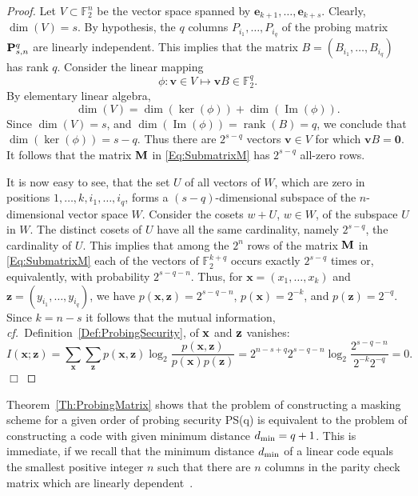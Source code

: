 \documentclass[11pt]{llncs}
\newcommand{\cf}{{\it cf.\ }}
\newcommand{\QED}{\hfill $\Box$}
\begin{document}
\begin{proof}
Let $V \subset \mathbb{F}_2^n$ be the vector space spanned by
$\mathbf{e}_{k+1},\dotsc,\mathbf{e}_{k+s}$.
Clearly, $\dim(V)= s$.
By hypothesis, the $q$ columns
$P_{i_1},\dotsc,P_{i_q}$ of the probing matrix $\mathbf{P}_{s,n}^q$ are linearly independent.
This implies that the matrix
$B=(B_{i_1},\dotsc,B_{i_q})$
has rank $q$.
Consider the linear mapping
\[
\phi : \mathbf{v} \in V \mapsto \mathbf{v}B \in \mathbb{F}_2^q.
\]
By elementary linear algebra,
\[
\dim(V) = \dim(\operatorname{ker}(\phi)) + \dim(\operatorname{Im}(\phi)).
\]
Since $\dim(V)=s$, and $\dim(\operatorname{Im}(\phi)) = \operatorname{rank}(B)=q$,
we conclude that
$\dim(\operatorname{ker}(\phi))=s-q$.
Thus there are $2^{s-q}$ vectors $\mathbf{v} \in V$ for which
$\mathbf{v}B = \mathbf{0}$.
It follows that the matrix $\mathbf{M}$ in \eqref{Eq:SubmatrixM}
has $2^{s-q}$ all-zero rows.

It is now easy to see, that the set $U$ of all vectors of $W$,
which are zero in positions
$1,\dotsc,k, i_1,\dotsc,i_q$,
forms a $(s-q)$-dimensional subspace of the $n$-dimensional vector  space $W$.
Consider the cosets $w+U$, $w\in W$, of the subspace $U$ in $W$.
The distinct cosets of $U$ have all the same cardinality,
namely $2^{s-q}$, the cardinality of $U$. This implies that
among the $2^n$ rows of the matrix $\mathbf{M}$ in \eqref{Eq:SubmatrixM}
each of the vectors of $\mathbb{F}_2^{k+q}$
occurs exactly $2^{s-q}$ times or, equivalently,
with probability $2^{s-q-n}$. Thus, for
$\mathbf{x}=(x_1,\dotsc,x_k)$ and $\mathbf{z}=(y_{i_1},\dotsc,y_{i_q})$,
we have $p( \mathbf{x},
\mathbf{z} ) = 2^{s-q-n}$, $p(\mathbf{x}) = 2^{-k}$, and $p(\mathbf{z}) = 2^{-q}$.
Since $k=n-s$ it follows that the mutual information,
\cf Definition~\ref{Def:ProbingSecurity},
of $\mathbf{x}$ and $\mathbf{z}$ vanishes:
\[
I(\mathbf{x}; \mathbf{z}) = \sum_{\mathbf{x}} \sum_{\mathbf{z}} p(\mathbf{x}, \mathbf{z}) \log_2
\frac{p(\mathbf{x}, \mathbf{z})}{p(\mathbf{x}) p(\mathbf{z})} = 2^{n-s+q} 2^{s-q-n} \log_2
\frac{2^{s-q-n}}{2^{-k} 2^{-q}} = 0.
\]
\QED
\end{proof}
Theorem~\ref{Th:ProbingMatrix} shows that the problem of constructing a
masking scheme for a given order of probing security PS(q) is
equivalent to the problem of constructing a code with given minimum
distance $d_\text{min} = q + 1$. This is immediate, if we recall that the
minimum distance $d_\text{min}$ of a linear code equals the smallest positive
integer $n$ such that there are $n$ columns in the parity check
matrix which are linearly dependent~\cite{MacWilliams2006TheoryofError-Correcting}.
\end{document}
